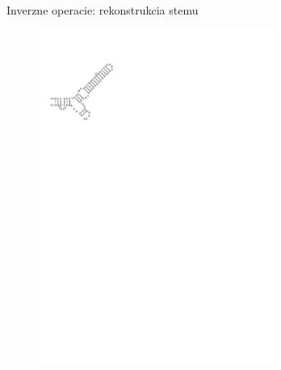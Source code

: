 \begin{figure}[H]
\begin{subfigure}{0.3\textwidth}
  \end{subfigure}
  \caption{Inverzne operacie: rekonstrukcia stemu}
  \label{obr:delete_insert_multibranch}
\end{figure}


\begin{figure}[H]
  \begin{subfigure}{0.3\textwidth}
    \includegraphics[clip, trim=1cm 21cm 14cm 2.5cm, width=0.85\textwidth]{../img/alg-insert/3/multibranch-beg}
  \end{subfigure}
  \begin{subfigure}{0.3\textwidth}

\end{subfigure}
\end{figure}
